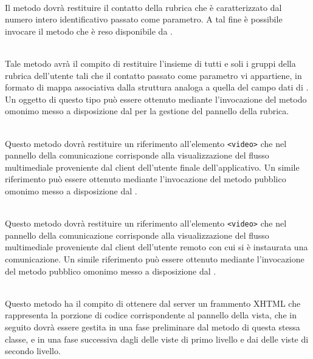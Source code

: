 \begin{description}
\item{}\\
Il metodo dovrà restituire il contatto della rubrica che è caratterizzato dal numero intero identificativo passato come parametro. A tal fine è possibile invocare il metodo  che è reso disponibile da .

\item{}\\
Tale metodo avrà il compito di restituire l'insieme di tutti e soli i gruppi della rubrica dell'utente tali che il contatto passato come parametro vi appartiene, in formato di mappa associativa dalla struttura analoga a quella del campo dati  di . Un oggetto di questo tipo può essere ottenuto mediante l'invocazione del metodo omonimo messo a disposizione dal  per la gestione del pannello della rubrica.

\item{}\\
Questo metodo dovrà restituire un riferimento all'elemento \verb'<video>' che nel pannello della comunicazione corrisponde alla visualizzazione del flusso multimediale proveniente dal client dell'utente finale dell'applicativo. Un simile riferimento può essere ottenuto mediante l'invocazione del metodo pubblico omonimo messo a disposizione dal .

\item{}\\
Questo metodo dovrà restituire un riferimento all'elemento \verb'<video>' che nel pannello della comunicazione corrisponde alla visualizzazione del flusso multimediale proveniente dal client dell'utente remoto con cui si è instaurata una comunicazione. Un simile riferimento può essere ottenuto mediante l'invocazione del metodo pubblico omonimo messo a disposizione dal .

\item{}\\
Questo metodo ha il compito di ottenere dal server un frammento XHTML che rappresenta la porzione di codice corrispondente al pannello della vista, che in seguito dovrà essere gestita in una fase preliminare dal metodo  di questa stessa classe, e in una fase successiva dagli  delle viste di primo livello e dai  delle viste di secondo livello.


\end{description}
